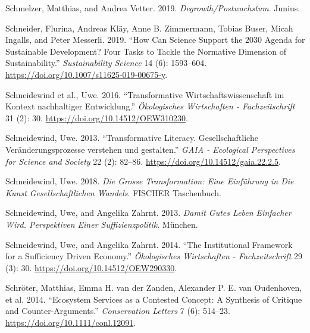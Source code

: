 \documentclass[
  a4paper,
  DIV=11,
  numbers=noendperiod,
  oneside,
  openany]{scrreprt}
\newlength{\cslhangindent}
\newenvironment{CSLReferences}[2] %
 {\begin{list}{}{%
  \setlength{\itemindent}{0pt}
  \setlength{\leftmargin}{0pt}
  \setlength{\parsep}{0pt}
  \ifodd #1
   \setlength{\leftmargin}{\cslhangindent}
   \setlength{\itemindent}{-1\cslhangindent}
  \fi
  \setlength{\itemsep}{#2\baselineskip}}}
 {\end{list}}
\begin{document}
\begin{CSLReferences}{1}{1}
Schmelzer, Matthias, and Andrea Vetter. 2019.
\emph{Degrowth/{Postwachstum}}. Junius.

Schneider, Flurina, Andreas Kläy, Anne B. Zimmermann, Tobias Buser,
Micah Ingalls, and Peter Messerli. 2019. {``How Can Science Support the
2030 {Agenda} for {Sustainable Development}? {Four} Tasks to Tackle the
Normative Dimension of Sustainability.''} \emph{Sustainability Science}
14 (6): 1593--604. \url{https://doi.org/10.1007/s11625-019-00675-y}.

Schneidewind et al., Uwe. 2016. {``{Transformative
Wirtschaftswissenschaft im Kontext nachhaltiger Entwicklung}.''}
\emph{{Ö}kologisches Wirtschaften - Fachzeitschrift} 31 (2): 30.
\url{https://doi.org/10.14512/OEW310230}.

Schneidewind, Uwe. 2013. {``{Transformative Literacy. Gesellschaftliche
Ver{ä}nderungsprozesse verstehen und gestalten}.''} \emph{GAIA -
Ecological Perspectives for Science and Society} 22 (2): 82--86.
\url{https://doi.org/10.14512/gaia.22.2.5}.

Schneidewind, Uwe. 2018. \emph{Die {Grosse Transformation}: {Eine
Einf{ü}hrung} in Die {Kunst} Gesellschaftlichen {Wandels}}. FISCHER
Taschenbuch.

Schneidewind, Uwe, and Angelika Zahrnt. 2013. \emph{Damit Gutes {Leben}
Einfacher Wird. {Perspektiven} Einer {Suffizienzpolitik}}. München.

Schneidewind, Uwe, and Angelika Zahrnt. 2014. {``The Institutional
Framework for a Sufficiency Driven Economy.''} \emph{Ökologisches
Wirtschaften - Fachzeitschrift} 29 (3): 30.
\url{https://doi.org/10.14512/OEW290330}.

{Schröter, Matthias, Emma H. van der Zanden, Alexander P. E. van
Oudenhoven, et al.} 2014. {``Ecosystem {Services} as a {Contested
Concept}: A {Synthesis} of {Critique} and {Counter-Arguments}.''}
\emph{Conservation Letters} 7 (6): 514--23.
\url{https://doi.org/10.1111/conl.12091}.


\end{CSLReferences}
\end{document}
